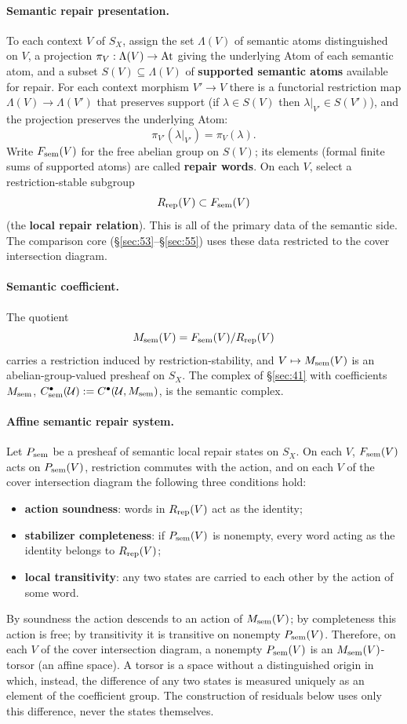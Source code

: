 \paragraph{Semantic repair presentation.}
To each context $V$ of $S_X$, assign the set $\Lambda(V)$ of semantic
atoms distinguished on $V$, a projection $\pi_V:\Lambda(V)\to\mathrm{At}$ giving
the underlying Atom of each semantic atom, and a subset
$S(V)\subseteq\Lambda(V)$ of \textbf{supported semantic atoms} available
for repair. For each context morphism $V'\to V$ there is a functorial
restriction map $\Lambda(V)\to\Lambda(V')$ that preserves support (if
$\lambda\in S(V)$ then $\lambda|_{V'}\in S(V')$), and the projection
preserves the underlying Atom:
\[
\pi_{V'}(\lambda|_{V'})=\pi_V(\lambda).
\]
Write $F_{\mathrm{sem}}(V)$ for the free abelian group on $S(V)$; its elements
(formal finite sums of supported atoms) are called \textbf{repair
words}. On each $V$, select a restriction-stable subgroup
\[
R_{\mathrm{rep}}(V)\subset F_{\mathrm{sem}}(V)
\]
(the \textbf{local repair relation}). This is all of the primary data of
the semantic side. The comparison core
(\S\ref{sec:53}--\S\ref{sec:55}) uses these data restricted to the cover
intersection diagram.

\paragraph{Semantic coefficient.}
The quotient
\[
M_{\mathrm{sem}}(V)=F_{\mathrm{sem}}(V)/R_{\mathrm{rep}}(V)
\]
carries a restriction induced by restriction-stability, and
$V\mapsto M_{\mathrm{sem}}(V)$ is an abelian-group-valued presheaf on $S_X$. The
complex of \S\ref{sec:41} with coefficients $M_{\mathrm{sem}}$,
$C^\bullet_{\mathrm{sem}}(\mathcal{U}):=C^\bullet(\mathcal{U},M_{\mathrm{sem}})$, is the semantic
complex.

\paragraph{Affine semantic repair system.}
Let $P_{\mathrm{sem}}$ be a presheaf of semantic local repair states on $S_X$. On
each $V$, $F_{\mathrm{sem}}(V)$ acts on $P_{\mathrm{sem}}(V)$, restriction commutes with the
action, and on each $V$ of the cover intersection diagram the following
three conditions hold:
\begin{itemize}
\item \textbf{action soundness}: words in $R_{\mathrm{rep}}(V)$ act as the
identity;
\item \textbf{stabilizer completeness}: if $P_{\mathrm{sem}}(V)$ is nonempty, every
word acting as the identity belongs to $R_{\mathrm{rep}}(V)$;
\item \textbf{local transitivity}: any two states are carried to each
other by the action of some word.
\end{itemize}
By soundness the action descends to an action of $M_{\mathrm{sem}}(V)$; by
completeness this action is free; by transitivity it is transitive on
nonempty $P_{\mathrm{sem}}(V)$. Therefore, on each $V$ of the cover intersection
diagram, a nonempty $P_{\mathrm{sem}}(V)$ is an $M_{\mathrm{sem}}(V)$-torsor (an affine
space). A torsor is a space without a distinguished origin in which,
instead, the difference of any two states is measured uniquely as an
element of the coefficient group. The construction of residuals below
uses only this difference, never the states themselves.

